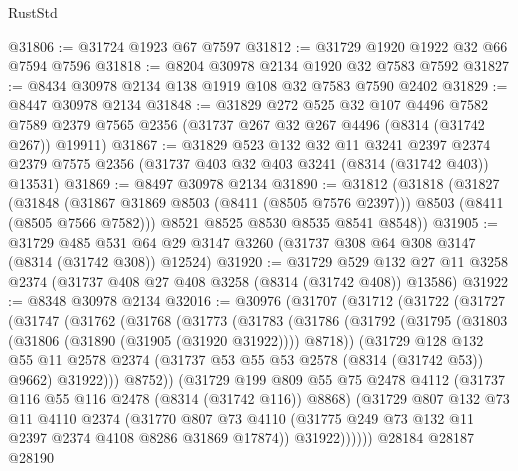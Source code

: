\begin{lexlean}{RustStd}
\begin{coremodule}
@31806 := @31724 @1923 @67 @7597
@31812 := @31729 @1920 @1922 @32 @66 @7594 @7596
@31818 := @8204 @30978 @2134 @1920 @32 @7583 @7592
@31827 := @8434 @30978 @2134 @138 @1919 @108 @32 @7583 @7590 @2402
@31829 := @8447 @30978 @2134
@31848 := @31829
    @272
    @525
    @32
    @107
    @4496
    @7582
    @7589
    @2379
    @7565
    @2356
    (@31737 @267 @32 @267 @4496 (@8314 (@31742 @267)) @19911)
@31867 := @31829
    @523
    @132
    @32
    @11
    @3241
    @2397
    @2374
    @2379
    @7575
    @2356
    (@31737 @403 @32 @403 @3241 (@8314 (@31742 @403)) @13531)
@31869 := @8497 @30978 @2134
@31890 := @31812
    (@31818
      (@31827
        (@31848 (@31867 @31869 @8503 (@8411 (@8505 @7576 @2397))) @8503 (@8411 (@8505 @7566 @7582)))
        @8521
        @8525
        @8530
        @8535
        @8541
        @8548))
@31905 := @31729
    @485
    @531
    @64
    @29
    @3147
    @3260
    (@31737 @308 @64 @308 @3147 (@8314 (@31742 @308)) @12524)
@31920 := @31729
    @529
    @132
    @27
    @11
    @3258
    @2374
    (@31737 @408 @27 @408 @3258 (@8314 (@31742 @408)) @13586)
@31922 := @8348 @30978 @2134
@32016 := @30976
    (@31707
      (@31712
        (@31722
          (@31727
            (@31747
              (@31762
                (@31768
                  (@31773
                    (@31783
                      (@31786
                        (@31792
                          (@31795 (@31803 (@31806 (@31890 (@31905 (@31920 @31922)))) @8718))
                          (@31729
                            @128
                            @132
                            @55
                            @11
                            @2578
                            @2374
                            (@31737 @53 @55 @53 @2578 (@8314 (@31742 @53)) @9662)
                            @31922)))
                      @8752))
                  (@31729
                    @199
                    @809
                    @55
                    @75
                    @2478
                    @4112
                    (@31737 @116 @55 @116 @2478 (@8314 (@31742 @116)) @8868)
                    (@31729
                      @807
                      @132
                      @73
                      @11
                      @4110
                      @2374
                      (@31770
                        @807
                        @73
                        @4110
                        (@31775 @249 @73 @132 @11 @2397 @2374 @4108 @8286 @31869 @17874))
                      @31922))))))
          @28184
          @28187
          @28190

\end{coremodule}
\end{lexlean}
